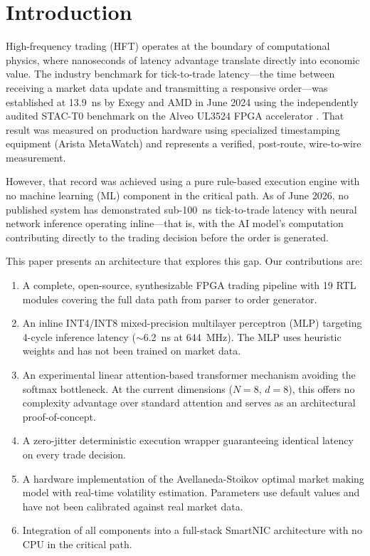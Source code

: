 \documentclass[conference,10pt]{IEEEtran}
\begin{document}
\section{Introduction}
\label{sec:intro}

High-frequency trading (HFT) operates at the boundary of computational physics, where nanoseconds of latency advantage translate directly into economic value. The industry benchmark for tick-to-trade latency---the time between receiving a market data update and transmitting a responsive order---was established at 13.9~ns by Exegy and AMD in June 2024 using the independently audited STAC-T0 benchmark on the Alveo UL3524 FPGA accelerator \cite{exegy2024}. That result was measured on production hardware using specialized timestamping equipment (Arista MetaWatch) and represents a verified, post-route, wire-to-wire measurement.

However, that record was achieved using a pure rule-based execution engine with no machine learning (ML) component in the critical path. As of June 2026, no published system has demonstrated sub-100~ns tick-to-trade latency with neural network inference operating inline---that is, with the AI model's computation contributing directly to the trading decision before the order is generated.

This paper presents an architecture that explores this gap. Our contributions are:

\begin{enumerate}[leftmargin=*]
    \item A complete, open-source, synthesizable FPGA trading pipeline with 19 RTL modules covering the full data path from parser to order generator.
    \item An inline INT4/INT8 mixed-precision multilayer perceptron (MLP) targeting 4-cycle inference latency ($\sim$6.2~ns at 644~MHz). The MLP uses heuristic weights and has not been trained on market data.
    \item An experimental linear attention-based transformer mechanism avoiding the softmax bottleneck. At the current dimensions ($N = 8$, $d = 8$), this offers no complexity advantage over standard attention and serves as an architectural proof-of-concept.
    \item A zero-jitter deterministic execution wrapper guaranteeing identical latency on every trade decision.
    \item A hardware implementation of the Avellaneda-Stoikov \cite{avellaneda2008} optimal market making model with real-time volatility estimation. Parameters use default values and have not been calibrated against real market data.
    \item Integration of all components into a full-stack SmartNIC architecture with no CPU in the critical path.
\end{enumerate}
\end{document}
